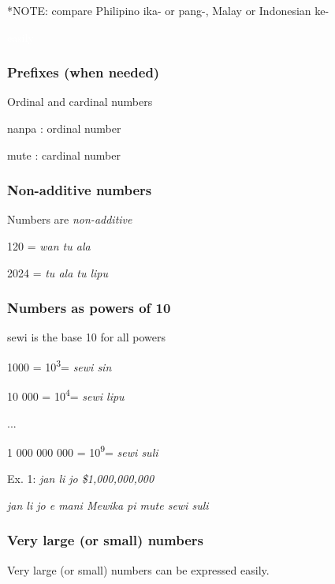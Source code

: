 \documentclass{article}
\begin{document}
\vspace{5pt}	

	*NOTE: compare Philipino ika- or pang-, Malay or Indonesian ke-

\newpage

\textcolor{white}{easily}

	
\subsubsection{Prefixes (when needed)}

    Ordinal and cardinal numbers
	
	nanpa {}:  ordinal number
	
	mute {}: cardinal number
	
	\hypertarget{non-additive-numbers}{%
		\subsubsection{Non-additive numbers}\label{non-additive-numbers}}
	
	Numbers are \emph{non-additive}
	
	120 = \emph{wan tu ala}
	
	2024 = \emph{tu ala tu lipu}
	
    \subsubsection{Numbers as powers of 10}
    
    sewi is the base 10 for all powers
	
	1000 = 10\textsuperscript{3}= \emph{sewi sin}
	
	10 000 = 10\textsuperscript{4}= \emph{sewi lipu}
	
	...
	
	1 000 000 000 = 10\textsuperscript{9}= \emph{sewi suli}
	
\vspace {12 pt}
	
	Ex. 1: \emph{jan li jo \$1,000,000,000}
	
	\emph{jan li jo e mani Mewika pi mute sewi suli}
	
\subsubsection{Very large (or small) numbers}

    Very large (or small) numbers can be expressed easily.
    
    \vspace {6 pt}
	
\end{document}
